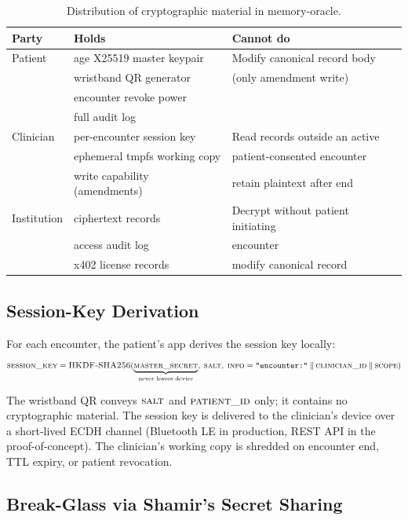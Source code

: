 \documentclass[runningheads]{llncs}
\begin{document}
\begin{table}[h]
\centering
\caption{Distribution of cryptographic material in memory-oracle.}
\label{tab:trust}
\begin{tabular}{lll}
\toprule
\textbf{Party} & \textbf{Holds} & \textbf{Cannot do} \\
\midrule
Patient & age X25519 master keypair & Modify canonical record body \\
        & wristband QR generator & (only amendment write) \\
        & encounter revoke power & \\
        & full audit log & \\
\midrule
Clinician & per-encounter session key & Read records outside an active \\
          & ephemeral tmpfs working copy & patient-consented encounter \\
          & write capability (amendments) & retain plaintext after end \\
\midrule
Institution & ciphertext records & Decrypt without patient initiating \\
            & access audit log & encounter \\
            & x402 license records & modify canonical record \\
\bottomrule
\end{tabular}
\end{table}

\subsection{Session-Key Derivation}

For each encounter, the patient's app derives the session key locally:
\[
\textsc{session\_key} = \textsc{HKDF-SHA256}(
  \underbrace{\textsc{master\_secret}}_{\text{never leaves device}},
  \;\textsc{salt},
  \;\textsc{info} = \texttt{"encounter:"} \mathbin\Vert \textsc{clinician\_id} \mathbin\Vert \textsc{scope}
)
\]

The wristband QR conveys $\textsc{salt}$ and $\textsc{patient\_id}$ only; it
contains no cryptographic material. The session key is delivered to the
clinician's device over a short-lived ECDH channel
(Bluetooth LE in production, REST API in the proof-of-concept). The
clinician's working copy is shredded on encounter end, TTL expiry, or
patient revocation.

\subsection{Break-Glass via Shamir's Secret Sharing}
\end{document}
